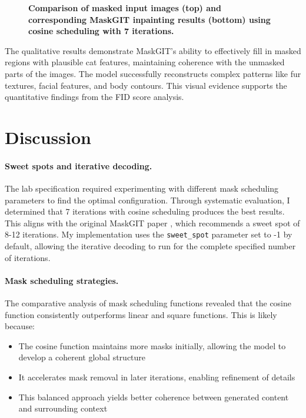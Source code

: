\documentclass[twocolumn,a4paper]{article}
\begin{document}
\begin{figure*}[ht]
    \caption{\textbf{Comparison of masked input images (top) and corresponding MaskGIT inpainting results (bottom) using cosine scheduling with 7 iterations.}}
    \label{fig:inpainting-comparison}
\end{figure*}

The qualitative results demonstrate MaskGIT's ability to effectively fill in masked regions with plausible cat features, maintaining coherence with the unmasked parts of the images. The model successfully reconstructs complex patterns like fur textures, facial features, and body contours. This visual evidence supports the quantitative findings from the FID score analysis.

\section{Discussion}

\paragraph{Sweet spots and iterative decoding.} The lab specification required experimenting with different mask scheduling parameters to find the optimal configuration. Through systematic evaluation, I determined that 7 iterations with cosine scheduling produces the best results. This aligns with the original MaskGIT paper \cite{chang2022maskgit}, which recommends a sweet spot of 8-12 iterations. My implementation uses the \texttt{sweet\_spot} parameter set to -1 by default, allowing the iterative decoding to run for the complete specified number of iterations.

\paragraph{Mask scheduling strategies.} The comparative analysis of mask scheduling functions revealed that the cosine function consistently outperforms linear and square functions. This is likely because:
\begin{itemize}
    \item The cosine function maintains more masks initially, allowing the model to develop a coherent global structure
    \item It accelerates mask removal in later iterations, enabling refinement of details
    \item This balanced approach yields better coherence between generated content and surrounding context
\end{itemize}
\end{document}
